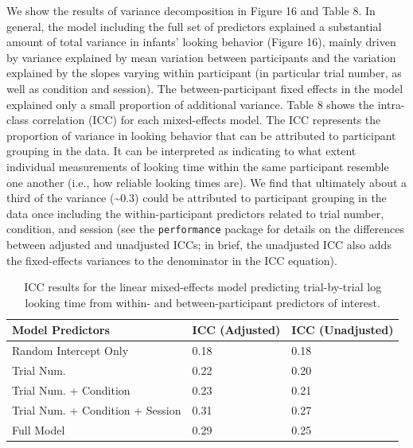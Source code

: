\documentclass[
  man, donotrepeattitle,floatsintext]{apa6}
\begin{document}
We show the results of variance decomposition in Figure 16 and Table 8.
In general, the model including the full set of predictors explained a substantial amount of total variance in infants' looking behavior (Figure 16), mainly driven by variance explained by mean variation between participants and the variation explained by the slopes varying within participant (in particular trial number, as well as condition and session).
The between-participant fixed effects in the model explained only a small proportion of additional variance.
Table 8 shows the intra-class correlation (ICC) for each mixed-effects model.
The ICC represents the proportion of variance in looking behavior that can be attributed to participant grouping in the data.
It can be interpreted as indicating to what extent individual measurements of looking time within the same participant resemble one another (i.e., how reliable looking times are).
We find that ultimately about a third of the variance (\textasciitilde0.3) could be attributed to participant grouping in the data once including the within-participant predictors related to trial number, condition, and session (see the \texttt{performance} package for details on the differences between adjusted and unadjusted ICCs; in brief, the unadjusted ICC also adds the fixed-effects variances to the denominator in the ICC equation).

\begin{table}[tbp]

\begin{center}
\begin{threeparttable}

\caption{\label{tab:unnamed-chunk-45}ICC results for the linear mixed-effects model predicting trial-by-trial log looking time from within- and between-participant predictors of interest.}

\begin{tabular}{lll}
\toprule
Model Predictors & \multicolumn{1}{c}{ICC (Adjusted)} & \multicolumn{1}{c}{ICC (Unadjusted)}\\
\midrule
Random Intercept Only & 0.18 & 0.18\\
Trial Num. & 0.22 & 0.20\\
Trial Num. + Condition & 0.23 & 0.21\\
Trial Num. + Condition + Session & 0.31 & 0.27\\
Full Model & 0.29 & 0.25\\
\bottomrule
\end{tabular}

\end{threeparttable}
\end{center}

\end{table}
\end{document}

